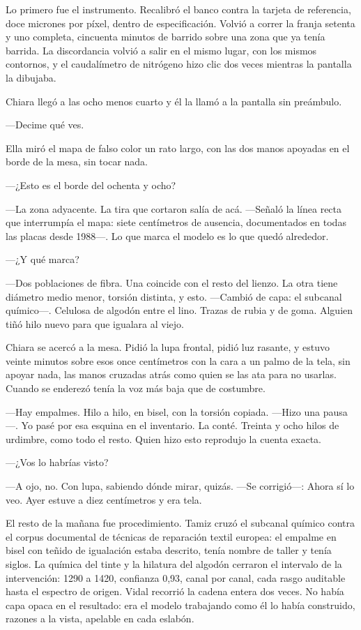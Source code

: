 Lo primero fue el instrumento. Recalibró el banco contra la tarjeta de referencia, doce micrones por píxel, dentro de especificación. Volvió a correr la franja setenta y uno completa, cincuenta minutos de barrido sobre una zona que ya tenía barrida. La discordancia volvió a salir en el mismo lugar, con los mismos contornos, y el caudalímetro de nitrógeno hizo clic dos veces mientras la pantalla la dibujaba.

Chiara llegó a las ocho menos cuarto y él la llamó a la pantalla sin preámbulo.

---Decime qué ves.

Ella miró el mapa de falso color un rato largo, con las dos manos apoyadas en el borde de la mesa, sin tocar nada.

---¿Esto es el borde del ochenta y ocho?

---La zona adyacente. La tira que cortaron salía de acá. ---Señaló la línea recta que interrumpía el mapa: siete centímetros de ausencia, documentados en todas las placas desde 1988---. Lo que marca el modelo es lo que quedó alrededor.

---¿Y qué marca?

---Dos poblaciones de fibra. Una coincide con el resto del lienzo. La otra tiene diámetro medio menor, torsión distinta, y esto. ---Cambió de capa: el subcanal químico---. Celulosa de algodón entre el lino. Trazas de rubia y de goma. Alguien tiñó hilo nuevo para que igualara al viejo.

Chiara se acercó a la mesa. Pidió la lupa frontal, pidió luz rasante, y estuvo veinte minutos sobre esos once centímetros con la cara a un palmo de la tela, sin apoyar nada, las manos cruzadas atrás como quien se las ata para no usarlas. Cuando se enderezó tenía la voz más baja que de costumbre.

---Hay empalmes. Hilo a hilo, en bisel, con la torsión copiada. ---Hizo una pausa---. Yo pasé por esa esquina en el inventario. La conté. Treinta y ocho hilos de urdimbre, como todo el resto. Quien hizo esto reprodujo la cuenta exacta.

---¿Vos lo habrías visto?

---A ojo, no. Con lupa, sabiendo dónde mirar, quizás. ---Se corrigió---: Ahora sí lo veo. Ayer estuve a diez centímetros y era tela.

El resto de la mañana fue procedimiento. Tamiz cruzó el subcanal químico contra el corpus documental de técnicas de reparación textil europea: el empalme en bisel con teñido de igualación estaba descrito, tenía nombre de taller y tenía siglos. La química del tinte y la hilatura del algodón cerraron el intervalo de la intervención: 1290 a 1420, confianza 0,93, canal por canal, cada rasgo auditable hasta el espectro de origen. Vidal recorrió la cadena entera dos veces. No había capa opaca en el resultado: era el modelo trabajando como él lo había construido, razones a la vista, apelable en cada eslabón.

